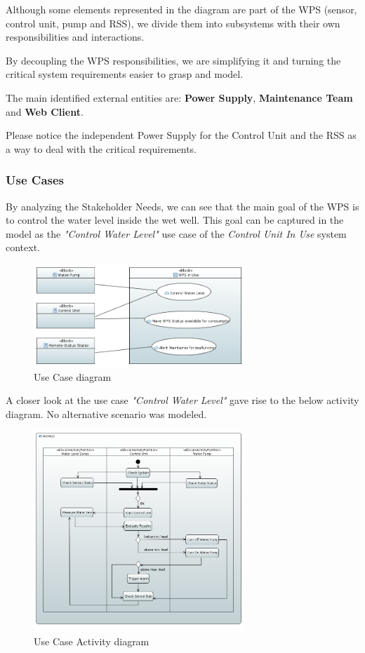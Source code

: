 \documentclass[11pt]{article}
\begin{document}
Although some elements represented in the diagram are part of the WPS (sensor, control unit, pump and RSS), we divide them into subsystems with their own responsibilities and interactions. 

By decoupling the WPS responsibilities, we are simplifying it and turning the critical system requirements easier to grasp and model. 

The main identified external entities are: \textbf{Power Supply}, \textbf{Maintenance Team} and \textbf{Web Client}. 

Please notice the independent Power Supply for the Control Unit and the RSS as a way to deal with the critical requirements.

\subsubsection{Use Cases}

By analyzing the Stakeholder Needs, we can see that the main goal of the WPS is to control the water level inside the wet well. This goal can be captured in the model as the \textit{"Control Water Level"} use case of the \textit{Control Unit In Use} system context. 

\begin{figure}[H]
  \centering
  \includegraphics[width=300px]{../diagrams/use-cases-01.png}
  \caption{Use Case diagram}
  \label{fig:Use Case1}
\end{figure}

A closer look at the use case \textit{"Control Water Level"} gave rise to the below activity diagram. No alternative scenario was modeled.

\begin{figure}[H]
  \centering
  \includegraphics[width=300px]{../diagrams/use-case-activity-diagram-01.png}
  \caption{Use Case Activity diagram}
  \label{fig:Use Case2}
\end{figure}
\end{document}
